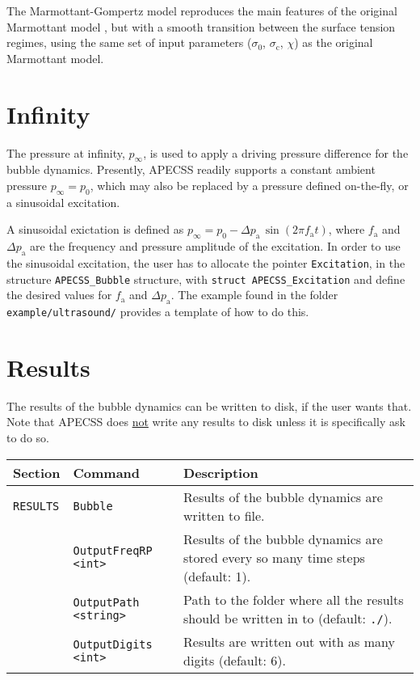 The Marmottant-Gompertz model reproduces the main features of the original Marmottant model \citep{Guemmer2021}, but with a smooth transition between the surface tension regimes, using the same set of input parameters ($\sigma_0$, $\sigma_\text{c}$, $\chi$) as the original Marmottant model.

\section{Infinity}
\label{sec:infinity}

The pressure at infinity, $p_\infty$, is used to apply a driving pressure difference for the bubble dynamics. Presently, APECSS readily supports a constant ambient pressure $p_\infty = p_0$, which may also be replaced by a pressure defined on-the-fly, or a sinusoidal excitation. 

A sinusoidal exictation is defined as $p_\infty = p_0 - \Delta p_\mathrm{a} \, \sin(2 \pi f_\mathrm{a} t)$, where $f_\mathrm{a}$ and $\Delta p_\mathrm{a}$ are the frequency and pressure amplitude of the excitation. In order to use the sinusoidal excitation, the user has to allocate the pointer {\tt *Excitation}, in the structure {\tt APECSS\_Bubble} structure, with {\tt struct APECSS\_Excitation} and define the desired values for  $f_\mathrm{a}$ and $\Delta p_\mathrm{a}$. The example found in the folder {\tt example/ultrasound/} provides a template of how to do this.

\section{Results}
\label{sec:bubbleresults}

The results of the bubble dynamics can be written to disk, if the user wants that. Note that APECSS does \underline{not} write any results to disk unless it is specifically ask to do so.

\vspace{0.8em}

\noindent
\begin{tabular}{p{} p{} p{}}
    \textbf{Section} &\textbf{Command} & \textbf{Description} 
\vspace{1mm} \\ \hline
{\tt RESULTS} & {\tt Bubble} & Results of the bubble dynamics are written to file.\\ 
& {\tt OutputFreqRP <int>} & Results of the bubble dynamics are stored every so many time steps (default: 1).\\ 
& {\tt OutputPath <string>} & Path to the folder where all the results should be written in to (default: {\tt ./}).\\
& {\tt OutputDigits <int>} & Results are written out with as many digits (default: 6).\\
 \hline
\end{tabular} \vspace{1em}

